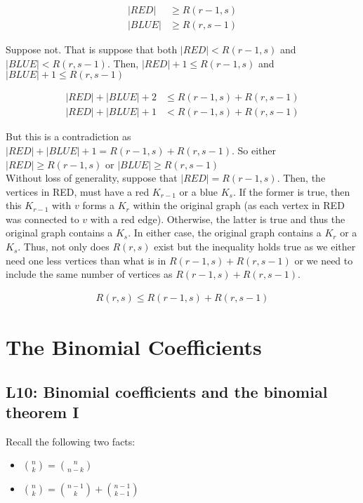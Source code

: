 \documentclass{report}
\begin{document}
\begin{subproof}
    \begin{align*}
        |RED|  & \ge R(r-1,s) \\
        |BLUE| & \ge R(r,s-1)
    \end{align*}

    Suppose not. That is suppose that both $|RED| < R(r-1,s)$ and $|BLUE| < R(r,s-1)$.
    Then, $|RED| + 1 \le R(r-1,s)$ and $|BLUE| + 1 \le R(r,s-1)$

    \begin{align*}
        |RED| + |BLUE| + 2 & \le R(r-1,s) + R(r,s-1) \\
        |RED| + |BLUE| + 1 & < R(r-1,s) + R(r,s-1)
    \end{align*}

    But this is a contradiction as $|RED| + |BLUE| + 1 = R(r-1,s) + R(r,s-1)$. So either
    $|RED| \ge R(r-1,s)$ or $|BLUE| \ge R(r,s-1)$ \\

    Without loss of generality, suppose that $|RED| = R(r-1,s)$. Then, the vertices
    in RED, must have a red $K_{r-1}$ or a blue $K_{s}$. If the former is true, then
    this $K_{r-1}$ with $v$ forms a $K_{r}$ within the original graph (as each vertex in
    RED was connected to $v$ with a red edge). Otherwise, the latter is true and thus the original
    graph contains a $K_{s}$. In either case, the original graph contains a $K_{r}$ or
    a $K_{s}$. Thus, not only does $R(r,s)$ exist but the inequality holds true as we
    either need one less vertices than what is in $R(r-1,s) + R(r,s-1)$ or we need
    to include the same number of vertices as $R(r-1,s) + R(r,s-1)$.

    \begin{align*}
        R(r,s) \le R(r-1,s) + R(r,s-1)
    \end{align*}
\end{subproof}

\setcounter{chapter}{4}

\chapter{The Binomial Coefficients}

\section{L10: Binomial coefficients and the binomial theorem I}

Recall the following two facts:

\begin{itemize}
    \item $\binom{n}{k} = \binom{n}{n-k}$
    \item $\binom{n}{k} = \binom{n-1}{k} + \binom{n-1}{k-1}$
\end{itemize}
\end{document}
